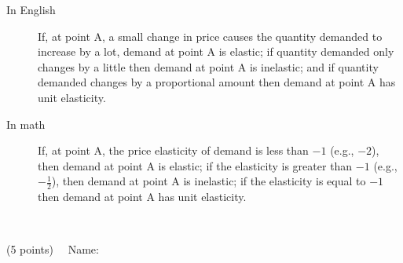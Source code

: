 \documentclass{article}
\begin{document}
\begin{EXAM}
\begin{itemize}
\begin{description}

\item [In English] If, at point A, a small change in price causes the quantity demanded to increase by a lot, demand at point A is elastic; if quantity demanded only changes by a little then demand at point A is inelastic; and if quantity demanded changes by a proportional amount then demand at point A has unit elasticity.

\item [In math] If, at point A, the price elasticity of demand is less than $-1$ (e.g., $-2$), then demand at point A is elastic; if the elasticity is greater than $-1$ (e.g., $-\frac{1}{2}$), then demand at point A is inelastic; if the elasticity is equal to $-1$ then demand at point A has unit elasticity.

\end{description}


\end{itemize}

\clearpage

\ \clearpage

\vspace*{-3cm}
\begin{flushright}
(5 points) \ \ Name: \hspace*{1in}
\bigskip
\end{flushright}

\end{EXAM}
\end{document}
